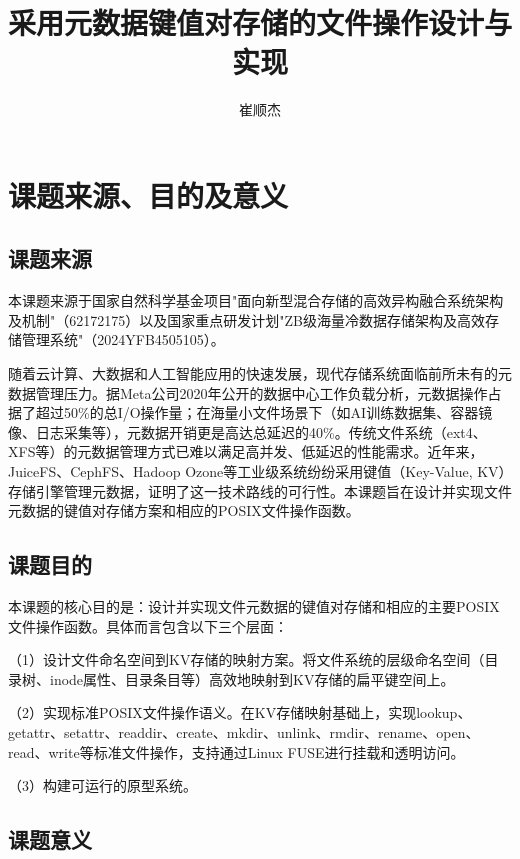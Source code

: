 \documentclass[supercite]{Hust-undergraduate-kaiti}
\title{采用元数据键值对存储的文件操作设计与实现}
\author{崔顺杰}
\theoremstyle{definition}
\begin{document}
\maketitle
\clearpage


\section{课题来源、目的及意义}
\subsection{课题来源}

本课题来源于国家自然科学基金项目"面向新型混合存储的高效异构融合系统架构及机制"（62172175）以及国家重点研发计划"ZB级海量冷数据存储架构及高效存储管理系统"（2024YFB4505105）。

随着云计算、大数据和人工智能应用的快速发展，现代存储系统面临前所未有的元数据管理压力。据Meta公司2020年公开的数据中心工作负载分析，元数据操作占据了超过50\%的总I/O操作量；在海量小文件场景下（如AI训练数据集、容器镜像、日志采集等），元数据开销更是高达总延迟的40\%\cite{ref_bfo}。传统文件系统（ext4、XFS等）的元数据管理方式已难以满足高并发、低延迟的性能需求。近年来，JuiceFS、CephFS、Hadoop Ozone等工业级系统纷纷采用键值（Key-Value, KV）存储引擎管理元数据，证明了这一技术路线的可行性。本课题旨在设计并实现文件元数据的键值对存储方案和相应的POSIX文件操作函数。

\subsection{课题目的}

本课题的核心目的是：设计并实现文件元数据的键值对存储和相应的主要POSIX文件操作函数。具体而言包含以下三个层面：

（1）设计文件命名空间到KV存储的映射方案。将文件系统的层级命名空间（目录树、inode属性、目录条目等）高效地映射到KV存储的扁平键空间上。

（2）实现标准POSIX文件操作语义。在KV存储映射基础上，实现lookup、getattr、setattr、readdir、create、mkdir、unlink、rmdir、rename、open、read、write等标准文件操作，支持通过Linux FUSE进行挂载和透明访问。

（3）构建可运行的原型系统。

\subsection{课题意义}
\end{document}

